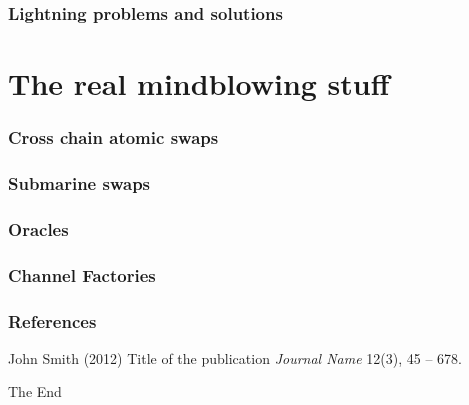 \documentclass{beamer}
\begin{document}
\begin{frame}
\frametitle{Lightning problems and solutions}

\end{frame}
\section{The real mindblowing stuff}
\begin{frame}
\frametitle{Cross chain atomic swaps}

\end{frame}
\begin{frame}
\frametitle{Submarine swaps}

\end{frame}

\begin{frame}
\frametitle{Oracles}

\end{frame}
\begin{frame}
\frametitle{Channel Factories}

\end{frame}

\begin{frame}
\frametitle{References}
\footnotesize{
\begin{thebibliography}{99} %
 John Smith (2012)
\newblock Title of the publication
\newblock \emph{Journal Name} 12(3), 45 -- 678.
\end{thebibliography}
}
\end{frame}


\begin{frame}
\Huge{\centerline{The End}}
\end{frame}

\end{document}
